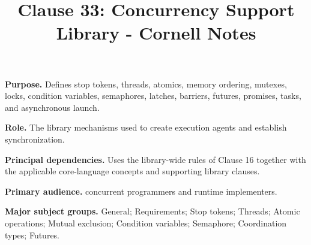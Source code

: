 \documentclass[11pt,letterpaper]{article}
\title{Clause 33: Concurrency Support Library - Cornell Notes}
\author{}
\date{}
\begin{document}
\maketitle
\begin{CornellReferenceOrientationBox}
\textbf{Purpose.} Defines stop tokens, threads, atomics, memory ordering, mutexes, locks, condition variables, semaphores, latches, barriers, futures, promises, tasks, and asynchronous launch.
\par\textbf{Role.} The library mechanisms used to create execution agents and establish synchronization.
\par\textbf{Principal dependencies.} Uses the library-wide rules of Clause 16 together with the applicable core-language concepts and supporting library clauses.
\par\textbf{Primary audience.} concurrent programmers and runtime implementers.
\par\textbf{Major subject groups.} General; Requirements; Stop tokens; Threads; Atomic operations; Mutual exclusion; Condition variables; Semaphore; Coordination types; Futures.
\end{CornellReferenceOrientationBox}
\end{document}
